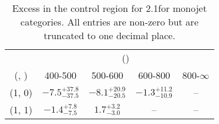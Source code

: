 \begin{table}[h!]
\tiny
\centering
\caption{Excess in the \gj control region for 2.1\ifb for monojet categories. All entries are non-zero but are truncated to one decimal place.\label{tab:excesssepnaive_gj_ewk_mono}}
\begin{tabular}
{ccccc}
	\hline\hline
	& \multicolumn{4}{c}{\scalht (\gev)} \\ 
	 (\njet,  \nb) & 400-500 & 500-600 & 600-800 & 800-$\infty$ \\ [0.8ex] 
\hline
	(1, 0) & $-7.5^{+ 37.8 }_{- 37.5 }$ & $-8.1^{+ 20.9 }_{- 20.5 }$ & $-1.3^{+ 11.2 }_{- 10.9 }$ & -- \\[0.5ex] 
	(1, 1) & $-1.4^{+ 7.8 }_{- 7.5 }$ & $1.7^{+ 3.2 }_{- 3.0 }$ & -- & -- \\[0.5ex] 
	\hline
	\hline
\end{tabular}
\end{table}
